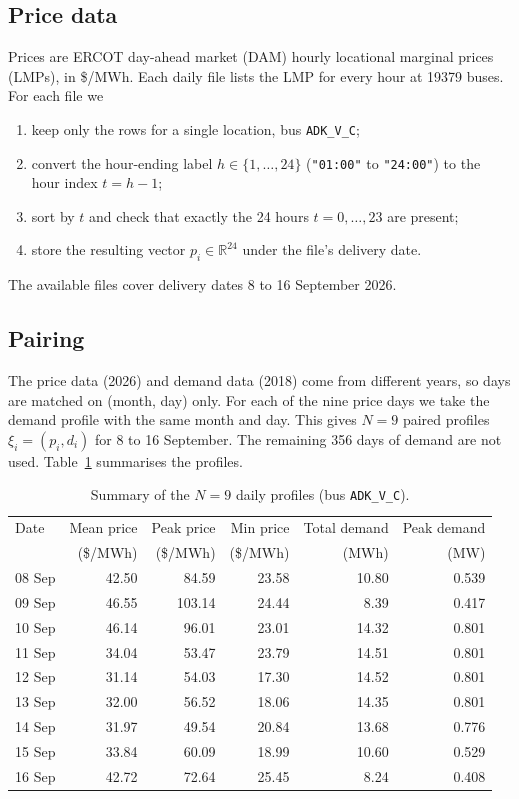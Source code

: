 \documentclass[11pt]{article}
\begin{document}
\subsection{Price data}

Prices are ERCOT day-ahead market (DAM) hourly locational marginal prices (LMPs),
in \$/MWh. Each daily file lists the LMP for every hour at \num{19379} buses. For
each file we
\begin{enumerate}
  \item keep only the rows for a single location, bus \texttt{ADK\_V\_C};
  \item convert the hour-ending label $h \in \{1, \dots, 24\}$
        (\texttt{"01:00"} to \texttt{"24:00"}) to the hour index $t = h - 1$;
  \item sort by $t$ and check that exactly the 24 hours $t = 0, \dots, 23$ are
        present;
  \item store the resulting vector $p_i \in \mathbb{R}^{24}$ under the file's
        delivery date.
\end{enumerate}
The available files cover delivery dates 8 to 16 September 2026.

\subsection{Pairing}

The price data (2026) and demand data (2018) come from different years, so days
are matched on (month, day) only. For each of the nine price days we take the
demand profile with the same month and day. This gives $N = 9$ paired profiles
$\xi_i = (p_i, d_i)$ for 8 to 16 September. The remaining 356 days of demand are
not used. Table~\ref{tab:profiles} summarises the profiles.

\begin{table}[h]
  \centering
  \caption{Summary of the $N = 9$ daily profiles (bus \texttt{ADK\_V\_C}).}
  \label{tab:profiles}
  \begin{tabular}{lrrrrr}
    \toprule
    Date & Mean price & Peak price & Min price & Total demand & Peak demand \\
         & (\$/MWh)   & (\$/MWh)   & (\$/MWh)  & (MWh)        & (MW)        \\
    \midrule
    08 Sep & 42.50 &  84.59 & 23.58 & 10.80 & 0.539 \\
    09 Sep & 46.55 & 103.14 & 24.44 &  8.39 & 0.417 \\
    10 Sep & 46.14 &  96.01 & 23.01 & 14.32 & 0.801 \\
    11 Sep & 34.04 &  53.47 & 23.79 & 14.51 & 0.801 \\
    12 Sep & 31.14 &  54.03 & 17.30 & 14.52 & 0.801 \\
    13 Sep & 32.00 &  56.52 & 18.06 & 14.35 & 0.801 \\
    14 Sep & 31.97 &  49.54 & 20.84 & 13.68 & 0.776 \\
    15 Sep & 33.84 &  60.09 & 18.99 & 10.60 & 0.529 \\
    16 Sep & 42.72 &  72.64 & 25.45 &  8.24 & 0.408 \\
    \bottomrule
  \end{tabular}
\end{table}
\end{document}
